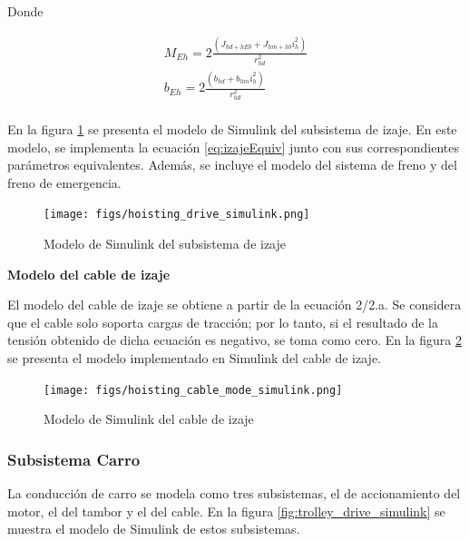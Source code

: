 \documentclass{article}
\begin{document}
            Donde

            \begin{align} \label{eq:izajeParamsEquiv}
                M_{Eh} = 2\frac{(J_{hd+hEb} + J_{hm+hb} i_h^2)}{r_{hd}^2}\\
                b_{Eh} = 2\frac{(b_{hd} + b_{hm}i_h^2)}{r_{hd}^2}\\
            \end{align}

            En la figura \ref{fig:hoisting_drive_simulink} se presenta el modelo de Simulink del subsistema de izaje. En este modelo, se implementa la ecuación \ref{eq:izajeEquiv} junto con sus correspondientes parámetros equivalentes. Además, se incluye el modelo del sistema de freno y del freno de emergencia. 

            \begin{figure} [H]
                \centering
                \texttt{[image: figs/hoisting\_drive\_simulink.png]}
                \caption{Modelo de Simulink del subsistema de izaje}
                \label{fig:hoisting_drive_simulink}
            \end{figure}

            \textbf{Modelo del cable de izaje}

            El modelo del cable de izaje se obtiene a partir de la ecuación 2/2.a. Se considera que el cable solo soporta cargas de tracción; por lo tanto, si el resultado de la tensión obtenido de dicha ecuación es negativo, se toma como cero. En la figura \ref{fig:hoisting_cable_mode_simulink} se presenta el modelo implementado en Simulink del cable de izaje.

            \begin{figure} [H]
                \centering
                \texttt{[image: figs/hoisting\_cable\_mode\_simulink.png]}
                \caption{Modelo de Simulink del cable de izaje}
                \label{fig:hoisting_cable_mode_simulink}
            \end{figure}


        \subsubsection{Subsistema Carro}

            La conducción de carro se modela como tres subsistemas, el de accionamiento del motor, el del tambor y el del cable. En la figura \ref{fig:trolley_drive_simulink} se muestra el modelo de Simulink de estos subsistemas. 
\end{document}
